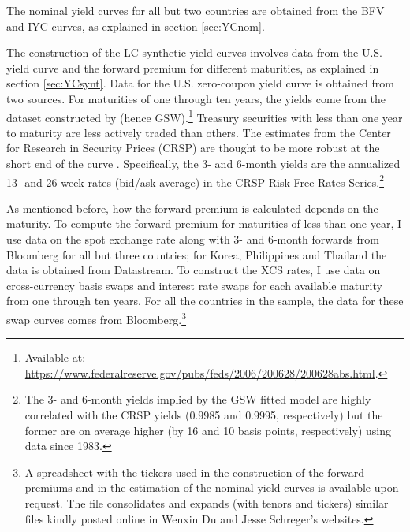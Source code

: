 {The nominal yield curves for all but two countries are obtained from the BFV and IYC curves, as explained in section \ref{sec:YCnom}. 

The construction of the LC synthetic yield curves involves data from the U.S. yield curve and the forward premium for different maturities, as explained in section \ref{sec:YCsynt}. 
Data for the U.S. zero-coupon yield curve is obtained from two sources. 
For maturities of one through ten years, the yields come from the dataset constructed by \cite*{GSW:2007} (hence GSW).\footnote{Available at: \url{https://www.federalreserve.gov/pubs/feds/2006/200628/200628abs.html}.} 
Treasury securities with less than one year to maturity are less actively traded than others. 
The estimates from the Center for Research in Security Prices (CRSP) are thought to be more robust at the short end of the curve \citep[see][]{GolinskiSpencer:2019}.
Specifically, the 3- and 6-month yields are the annualized 13- and 26-week rates (bid/ask average) in the CRSP Risk-Free Rates Series.\footnote{ The 3- and 6-month yields implied by the GSW fitted model are highly correlated with the CRSP yields (0.9985 and 0.9995, respectively) but the former are on average higher (by 16 and 10 basis points, respectively) using data since 1983.} 

As mentioned before, how the forward premium is calculated depends on the maturity.
To compute the forward premium for maturities of less than one year, I use data on the spot exchange rate along with 3- and 6-month forwards from Bloomberg for all but three countries; for Korea, Philippines and Thailand the data is obtained from Datastream.
To construct the XCS rates, I use data on cross-currency basis swaps and interest rate swaps for each available maturity from one through ten years. 
For all the countries in the sample, the data for these swap curves comes from Bloomberg.\footnote{A spreadsheet with the tickers used in the construction of the forward premiums and in the estimation of the nominal yield curves is available upon request. The file consolidates and expands (with tenors and tickers) similar files kindly posted online in Wenxin Du and Jesse Schreger's websites.}



}{}	%


